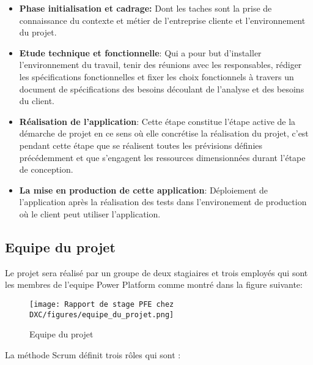\begin{itemize}
  \item \textbf{Phase initialisation et cadrage: }
        Dont les taches sont la prise de connaissance du contexte et métier de
        l’entreprise cliente et l’environnement du projet.
    \\
    \item \textbf{Etude technique et fonctionnelle}: 
        Qui a pour but d’installer l’environnement du travail, tenir des réunions avec les responsables, rédiger les spécifications fonctionnelles et fixer les choix fonctionnels à travers un document de spécifications des besoins découlant de l’analyse et des besoins du client.
    \\    
    \item \textbf{Réalisation de l’application}: 
        Cette étape constitue l'étape active de la démarche de projet en ce sens où
        elle concrétise la réalisation du projet, c'est pendant cette étape que se réalisent toutes les prévisions définies précédemment et que s'engagent les ressources dimensionnées durant l'étape de conception.
    \\    
    \item \textbf{La mise en production de cette application}: 
        Déploiement de l’application après la réalisation des tests dans l'environement de production où le client peut utiliser l’application.
    \\    

\end{itemize}

\subsection{Equipe du projet}
Le projet sera réalisé par un groupe de deux stagiaires et trois employés qui sont les membres de l'equipe Power Platform comme montré dans la figure suivante:
\\

\begin{figure}[!h]
    \centering
    \texttt{[image: Rapport de stage PFE chez DXC/figures/equipe\_du\_projet.png]}
    \caption{Equipe du projet}
\end{figure}

La méthode Scrum définit trois rôles qui sont :
\\

